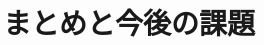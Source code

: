 \documentclass{deimj}
\begin{document}


\section{まとめと今後の課題}
\label{sec:Conclusions}

\end{document}
